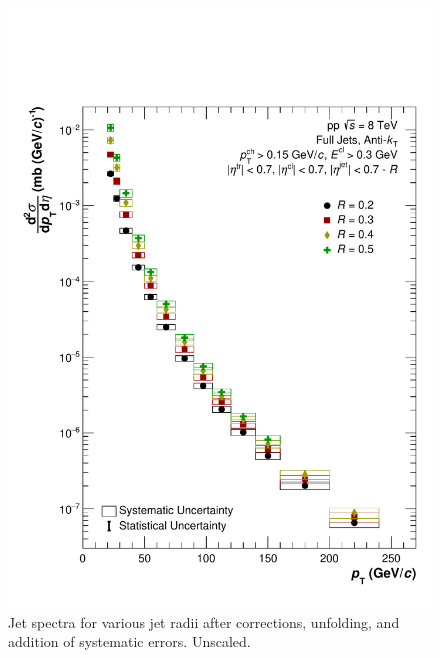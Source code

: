 \documentclass[ALICE]{ALICE_analysis_notes}
\begin{document}
\begin{figure}
    \centering
    \includegraphics[width=15cm]{figures/FinalResults/Bayes_reg6_unscaled.pdf}
    \caption{Jet spectra for various jet radii after corrections, unfolding, and addition of systematic errors. Unscaled.}
    \label{fig:finalSpectraUnscaled}
\end{figure}
\end{document}
